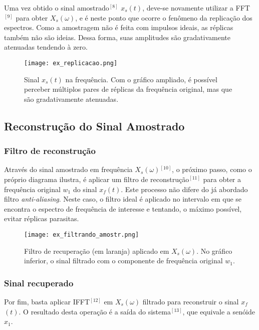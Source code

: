 \documentclass[journal]{IEEEtran}
\begin{document}
Uma vez obtido o sinal amostrado$^{[8]}$ $x$$_s$$(t)$, deve-se novamente utilizar a FFT$^{[9]}$ para obter $X$$_s$$(\omega)$, e é neste ponto que ocorre o fenômeno da replicação dos espectros. Como a amostragem não é feita com impulsos ideais, as réplicas também não são ideias. Dessa forma, suas amplitudes são gradativamente atenuadas tendendo à zero.

\begin{figure}[H]
\captionsetup{justification=centering}
\centering %
\texttt{[image: ex\_replicacao.png]} %
\caption{Sinal $x$$_s$$(t)$ na frequência. Com o gráfico ampliado, é possível perceber múltiplos pares de réplicas da frequência original, mas que são gradativamente atenuadas.}
\end{figure}

\subsection{Reconstrução do Sinal Amostrado}

\subsubsection{Filtro de reconstrução}

Através do sinal amostrado em frequência $X$$_s$$(\omega)$$^{[10]}$, o próximo passo, como o próprio diagrama ilustra, é aplicar um filtro de reconstrução$^{[11]}$ para obter a frequência original $w$$_1$ do sinal $x$$_f$$(t)$. Este processo não difere do já abordado filtro \textit{anti-aliasing}. Neste caso, o filtro ideal é aplicado no intervalo em que se encontra o espectro de frequência de interesse e tentando, o máximo possível, evitar réplicas parasitas.

\begin{figure}[H]
\captionsetup{justification=centering}
\centering %
\texttt{[image: ex\_filtrando\_amostr.png]} %
\caption{Filtro de recuperação (em laranja) aplicado em $X$$_s$$(\omega)$. No gráfico inferior, o sinal filtrado com o componente de frequência original $w$$_1$.}
\end{figure}

\subsubsection{Sinal recuperado}

Por fim, basta aplicar IFFT$^{[12]}$ em $X$$_s$$(\omega)$ filtrado para reconstruir o sinal $x$$_f$$(t)$. O resultado desta operação é a saída do sistema$^{[13]}$, que equivale a senóide $x$$_1$.
\end{document}
